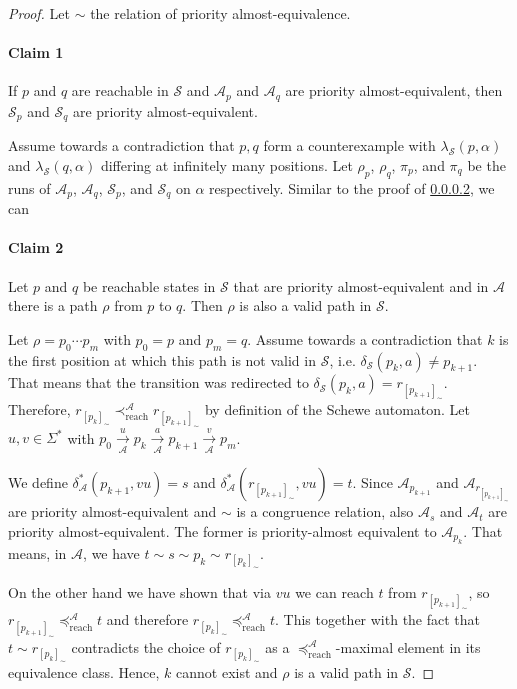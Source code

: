 \begin{proof} 
	Let $\sim$ the relation of priority almost-equivalence.
	
	\paragraph{Claim 1} If $p$ and $q$ are reachable in $\mathcal{S}$ and $\mathcal{A}_p$ and $\mathcal{A}_q$ are priority almost-equivalent, then $\mathcal{S}_p$ and $\mathcal{S}_q$ are priority almost-equivalent.
	
	Assume towards a contradiction that $p, q$ form a counterexample with $\lambda_\mathcal{S}(p, \alpha)$ and $\lambda_\mathcal{S}(q, \alpha)$ differing at infinitely many positions. Let $\rho_p$, $\rho_q$, $\pi_p$, and $\pi_q$ be the runs of $\mathcal{A}_p$, $\mathcal{A}_q$, $\mathcal{S}_p$, and $\mathcal{S}_q$ on $\alpha$ respectively.	Similar to the proof of \ref{}, we can  %
	
	\paragraph{Claim 2} Let $p$ and $q$ be reachable states in $\mathcal{S}$ that are priority almost-equivalent and in $\mathcal{A}$ there is a path $\rho$ from $p$ to $q$. Then $\rho$ is also a valid path in $\mathcal{S}$.
	
	Let $\rho = p_0 \cdots p_m$ with $p_0 = p$ and $p_m = q$. Assume towards a contradiction that $k$ is the first position at which this path is not valid in $\mathcal{S}$, i.e. $\delta_\mathcal{S}(p_k, a) \neq p_{k+1}$. That means that the transition was redirected to $\delta_\mathcal{S}(p_k, a) = r_{[p_{k+1}]_\sim}$. Therefore, $r_{[p_k]_\sim} \prec_\text{reach}^\mathcal{A} r_{[p_{k+1}]_\sim}$ by definition of the Schewe automaton. Let $u, v \in \Sigma^*$ with $p_0 \overset{u}{\underset{\mathcal{A}}{\rightarrow}} p_k \overset{a}{\underset{\mathcal{A}}{\rightarrow}} p_{k+1} \overset{v}{\underset{\mathcal{A}}{\rightarrow}} p_m$.
	
	We define $\delta^*_\mathcal{A}(p_{k+1}, vu) = s$ and $\delta^*_\mathcal{A}(r_{[p_{k+1}]_\sim}, vu) = t$. Since $\mathcal{A}_{p_{k+1}}$ and $\mathcal{A}_{r_{[p_{k+1}]_\sim}}$ are priority almost-equivalent and $\sim$ is a congruence relation, also $\mathcal{A}_s$ and $\mathcal{A}_t$ are priority almost-equivalent. The former is priority-almost equivalent to $\mathcal{A}_{p_k}$. That means, in $\mathcal{A}$, we have $t \sim s \sim p_k \sim r_{[p_k]_\sim}$.
	
	On the other hand we have shown that via $vu$ we can reach $t$ from $r_{[p_{k+1}]_\sim}$, so $r_{[p_{k+1}]_\sim} \preceq_\text{reach}^\mathcal{A} t$ and therefore $r_{[p_k]_\sim} \preceq_\text{reach}^\mathcal{A} t$. This together with the fact that $t \sim r_{[p_k]_\sim}$ contradicts the choice of $r_{[p_k]_\sim}$ as a $\preceq_\text{reach}^\mathcal{A}$-maximal element in its equivalence class. Hence, $k$ cannot exist and $\rho$ is a valid path in $\mathcal{S}$.
	

\end{proof}
